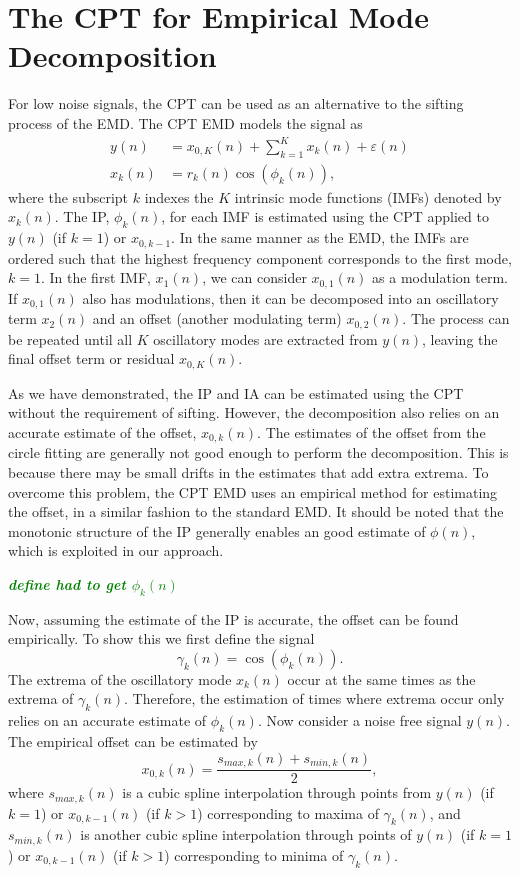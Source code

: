 \documentclass[a4paper]{IEEEtran}
\newcommand{\dean}[1]{\textsf{\emph{\textbf{\textcolor{green}{#1}}}}}
\begin{document}
\section{The CPT for Empirical Mode Decomposition}\label{sect:CPTEMDSection}
For low noise signals, the CPT can be used as an alternative to the sifting process of the EMD. The CPT EMD models the signal as
\begin{align}
    y(n) &= x_{0,K}(n) + \sum_{k=1}^{K}x_k(n) + \varepsilon(n) \\
    x_k\left(n\right) &= r_k\left(n\right)\cos\left(\phi_k\left(n\right)\right),
\end{align}
where the subscript $k$ indexes the $K$ intrinsic mode functions (IMFs) denoted by $x_k(n)$. The IP, $\phi_k(n)$, for each IMF is estimated using the CPT applied to $y(n)$ (if $k=1$) or $x_{0,k-1}$. In the same manner as the EMD, the IMFs are ordered such that the highest frequency component corresponds to the first mode, $k=1$. In the first IMF, $x_1(n)$, we can consider $x_{0,1}(n)$ as a modulation term. If $x_{0,1}(n)$ also has modulations, then it can be decomposed into an oscillatory term $x_2(n)$ and an offset (another modulating term) $x_{0,2}(n)$. The process can be repeated until all $K$ oscillatory modes are extracted from $y(n)$, leaving the final offset term or residual $x_{0,K}(n)$.

As we have demonstrated, the IP and IA can be estimated using the CPT without the requirement of sifting. However, the decomposition also relies on an accurate estimate of the offset, $x_{0,k}(n)$. The estimates of the offset from the circle fitting are generally not good enough to perform the decomposition. This is because there may be small drifts in the estimates that add extra extrema. To overcome this problem, the CPT EMD uses an empirical method for estimating the offset, in a similar fashion to the standard EMD. It should be noted that the monotonic structure of the IP generally enables an good estimate of $\phi(n)$, which is exploited in our approach. 

\dean{define had to get $\phi_k(n)$}

Now, assuming the estimate of the IP is accurate, the offset can be found empirically. To show this we first define the signal
\begin{equation}
	\gamma_k(n)=\cos(\phi_k(n)).
\end{equation}   
The extrema of the oscillatory mode $x_k(n)$ occur at the same times as the extrema of $\gamma_k(n)$. Therefore, the estimation of times where extrema occur only relies on an accurate estimate of $\phi_k(n)$. Now consider a noise free signal $y(n)$. The empirical offset can be estimated by 
\begin{equation}
    x_{0,k}(n) = \frac{s_{max,k}(n) + s_{min,k}(n)}{2},
\end{equation}
where $s_{max,k}(n)$ is a cubic spline interpolation through points from $y(n)$ (if $k=1$) or $x_{0,k-1}(n)$ (if $k>1$) corresponding to maxima of $\gamma_k(n)$, and $s_{min,k}(n)$ is another cubic spline interpolation through points of $y(n)$ (if $k=1$) or $x_{0,k-1}(n)$ (if $k>1$) corresponding to minima of $\gamma_k(n)$. 
\end{document}
